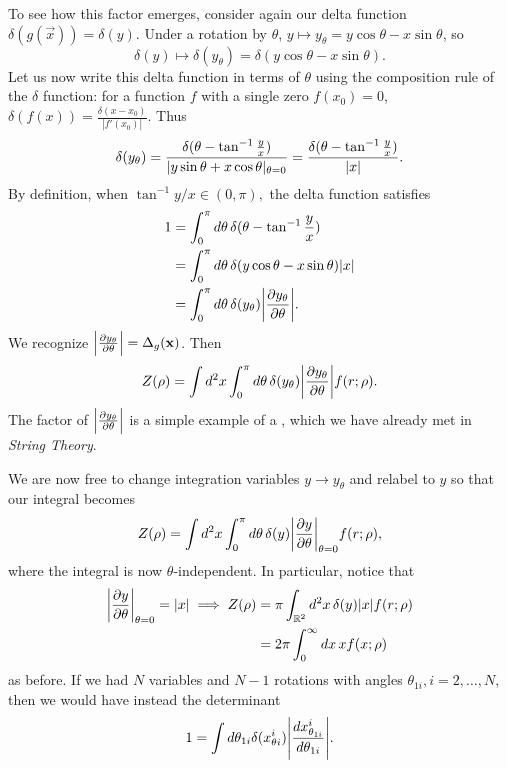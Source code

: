 To see how this factor emerges, consider again our delta function $\delta(g(\vec x))=\delta(y)$. Under a rotation by $\theta$, $y\mapsto y_\theta = y\cos\theta -x\sin\theta$, so
\begin{equation}
    \delta(y) \mapsto \delta(y_\theta) = \delta(y\cos\theta-x\sin\theta).
\end{equation}
Let us now write this delta function in terms of $\theta$ using the composition rule of the $\delta$ function: for a function $f$ with a single zero $f(x_0)=0$, $\delta(f(x))=\frac{\delta(x-x_0)}{|f'(x_0)|}$. Thus
\begin{equation}
    \delta(y_\theta)=\frac{\delta(\theta-\tan^{-1}\frac{y}{x})}{\abs{y\sin\theta +x\cos\theta}_{\theta=0}}=\frac{\delta(\theta-\tan^{-1}\frac{y}{x})}{|x|}.
\end{equation}
By definition, when $\tan^{-1} y/x \in (0,\pi),$ the delta function satisfies
\begin{align*}
    1 &= \int_0^\pi d\theta\, \delta(\theta-\tan^{-1}\frac{y}{x})\\
        &= \int_0^\pi d\theta \, \delta(y\cos\theta-x\sin\theta)\abs{x}\\
        &= \int_0^\pi d\theta\, \delta(y_\theta) \abs*{\P{y_\theta}{\theta}}.
\end{align*}
We recognize $\abs*{\P{y_\theta}{\theta}}=\Delta_g(\vec x)$. Then
\begin{equation}
    Z(\rho)=\int d^2x \int_0^\pi d\theta\, \delta(y_\theta) \abs*{\P{y_\theta}{\theta}} f(r;\rho).
\end{equation}
The factor of $\abs*{\P{y_\theta}{\theta}}$ is a simple example of a , which we have already met in \emph{String Theory}.

We are now free to change integration variables $y\to y_\theta$ and relabel to $y$ so that our integral becomes
\begin{equation}
    Z(\rho) = \int d^2x\int_0^\pi d\theta\, \delta(y)\abs*{\P{y}{\theta}}_{\theta=0} f(r;\rho),
\end{equation}
where the integral is now $\theta$-independent.
In particular, notice that
\begin{align*}
    \abs*{\P{y}{\theta}}_{\theta=0} =|x| \implies Z(\rho) &= \pi \int_{\RR^2} d^2x \,\delta(y) |x| f(r;\rho)\\
    &= 2\pi \int_0^\infty dx\, x f(x;\rho)
\end{align*}
as before.
If we had $N$ variables and $N-1$ rotations with angles $\theta_{1i},i=2,\ldots, N$, then we would have instead the determinant
\begin{equation}
    1=\int d\theta_{1i} \delta(x_{\theta i}^i) \abs*{\frac{dx_{\theta_{1i}}^i}{d\theta_{1i}}}.
\end{equation}


